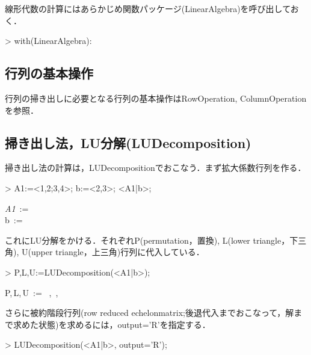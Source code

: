 線形代数の計算にはあらかじめ関数パッケージ(LinearAlgebra)を呼び出しておく．
\begin{MapleInput}
> with(LinearAlgebra):
\end{MapleInput}

\subsection{行列の基本操作}
行列の掃き出しに必要となる行列の基本操作はRowOperation, ColumnOperationを参照．

\subsection{掃き出し法，LU分解(LUDecomposition)}
掃き出し法の計算は，LUDecompositionでおこなう．まず拡大係数行列を作る．
\begin{MapleInput}
> A1:=<1,2;3,4>; b:=<2,3>; <A1|b>;
\end{MapleInput}
\begin{MapleOutputGather}
{\it A1}\, := \, \left[ \begin {array}{cc} 1&2\\ 3&4\end {array} \right] \notag \\
b\, := \, \left[ \begin {array}{c} 2\\ 3\end {array} \right] \notag \\
  \notag
\end{MapleOutputGather}
これにLU分解をかける．それぞれP(permutation，置換), L(lower triangle，下三角), U(upper
triangle，上三角)行列に代入している．
\begin{MapleInput}
> P,L,U:=LUDecomposition(<A1|b>);
\end{MapleInput}
\begin{MapleOutput}
P,\,L,\,U\, := \, \left[ \begin {array}{cc} 1&0\\ 0&1\end {array} \right] ,\, \left[ \begin {array}{cc} 1&0\\ 3&1\end {array} \right] ,\,  
\end{MapleOutput}
さらに被約階段行列(row reduced echelonmatrix;後退代入までおこなって，解まで求めた状態)を求めるには，output='R'を指定する．
\begin{MapleInput}
> LUDecomposition(<A1|b>, output='R');
\end{MapleInput}
\begin{MapleOutput}
\end{MapleOutput}

